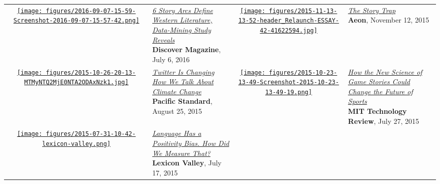 \begin{longtable}{c p{7.5cm} c p{7.5cm} }
\rule{0pt}{5ex} 
\parbox[c]{1.1cm}{ \href{http://blogs.discovermagazine.com/d-brief/2016/07/06/the-6-story-arcs-that-define-western-literature/}{\texttt{[image: figures/2016-09-07-15-59-Screenshot-2016-09-07-15-57-42.png]}} }
& \parbox[c]{7.5cm}{ {\small \textcolor{blue}{\textit{\href{http://blogs.discovermagazine.com/d-brief/2016/07/06/the-6-story-arcs-that-define-western-literature/} {6 Story Arcs Define Western Literature, Data-Mining Study Reveals} } } }\\ \textbf{Discover Magazine}, July 6, 2016 }  &  
\parbox[c]{1.1cm}{ \href{https://aeon.co/essays/why-story-is-used-to-explain-symphonies-and-sport-matches-alike}{\texttt{[image: figures/2015-11-13-13-52-header\_Relaunch-ESSAY-42-41622594.jpg]}} }
& \parbox[c]{7.5cm}{ {\small \textcolor{blue}{\textit{\href{https://aeon.co/essays/why-story-is-used-to-explain-symphonies-and-sport-matches-alike} {The Story Trap} } } }\\ \textbf{Aeon}, November 12, 2015 }  \\
\rule{0pt}{5ex} 
\parbox[c]{1.1cm}{ \href{http://www.psmag.com/nature-and-technology/tweeting-the-end-of-the-world}{\texttt{[image: figures/2015-10-26-20-13-MTMyNTQ2MjE0NTA2ODAxNzk1.jpg]}} }
& \parbox[c]{7.5cm}{ {\small \textcolor{blue}{\textit{\href{http://www.psmag.com/nature-and-technology/tweeting-the-end-of-the-world} {Twitter Is Changing How We Talk About Climate Change} } } }\\ \textbf{Pacific Standard}, August 25, 2015 }  &  
\parbox[c]{1.1cm}{ \href{http://www.technologyreview.com/view/539706/how-the-new-science-of-game-stories-could-change-the-future-of-sports/}{\texttt{[image: figures/2015-10-23-13-49-Screenshot-2015-10-23-13-49-19.png]}} }
& \parbox[c]{7.5cm}{ {\small \textcolor{blue}{\textit{\href{http://www.technologyreview.com/view/539706/how-the-new-science-of-game-stories-could-change-the-future-of-sports/} {How the New Science of Game Stories Could Change the Future of Sports} } } }\\ \textbf{MIT Technology Review}, July 27, 2015 }  \\
\rule{0pt}{5ex} 
\parbox[c]{1.1cm}{ \href{http://www.slate.com/articles/podcasts/lexicon_valley/2015/06/lexicon_valley_the_pollyanna_hypothesis_all_languages_have_a_positivity.html}{\texttt{[image: figures/2015-07-31-10-42-lexicon-valley.png]}} }
& \parbox[c]{7.5cm}{ {\small \textcolor{blue}{\textit{\href{http://www.slate.com/articles/podcasts/lexicon_valley/2015/06/lexicon_valley_the_pollyanna_hypothesis_all_languages_have_a_positivity.html} {Language Has a Positivity Bias. How Did We Measure That?} } } }\\ \textbf{Lexicon Valley}, July 17, 2015 }  &  

\end{longtable}
